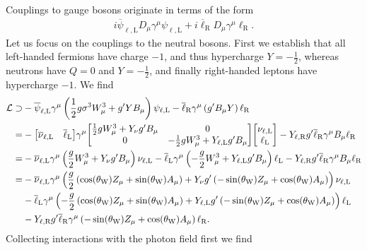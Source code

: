 Couplings to gauge bosons originate in terms of the form
\begin{align*}
	i\overline{\psi}_{\ell, \text{L}}D_{\mu}\gamma^{\mu}\psi_{\ell, \text{L}} + i\overline{\ell}_{\text{R}}D_{\mu}\gamma^{\mu}\ell_{\text{R}}.
\end{align*}
Let us focus on the couplings to the neutral bosons. First we establish that all left-handed fermions have charge $-1$, and thus hypercharge $Y = -\frac{1}{2}$, whereas neutrons have $Q = 0$ and $Y = -\frac{1}{2}$, and finally right-handed leptons have hypercharge $-1$. We find
\begin{align*}
	\lag \supset& -\overline{\psi}_{\ell, \text{L}}\gamma^{\mu}\left(\frac{1}{2}g\sigma^{3}W^{3}_{\mu} + g\p YB_{\mu}\right)\psi_{\ell, \text{L}} - \overline{\ell}_{\text{R}}\gamma^{\mu}\left(g\p B_{\mu}Y\right)\ell_{\text{R}} \\
    =& -\mqty[
		\overline{\nu}_{\ell, \text{L}} & \overline{\ell}_{\text{L}}
	]\gamma^{\mu}\mqty[
		\frac{1}{2}gW^{3}_{\mu} + Y_{\nu}g\p B_{\mu} & 0 \\
		 0 & -\frac{1}{2}gW^{3}_{\mu} + Y_{\ell, \text{L}}g\p B_{\mu}
	]\mqty[
		\nu_{\ell, \text{L}} \\
		\ell_{\text{L}}
	] - Y_{\ell, \text{R}}g\p\overline{\ell}_{\text{R}}\gamma^{\mu}B_{\mu}\ell_{\text{R}} \\
	=& -\overline{\nu}_{\ell, \text{L}}\gamma^{\mu}\left(\frac{g}{2}W^{3}_{\mu} + Y_{\nu}g\p B_{\mu}\right)\nu_{\ell, \text{L}} - \overline{\ell}_{\text{L}}\gamma^{\mu}\left(-\frac{g}{2}W^{3}_{\mu} + Y_{\ell, \text{L}}g\p B_{\mu}\right)\ell_{\text{L}} - Y_{\ell, \text{R}}g\p\overline{\ell}_{\text{R}}\gamma^{\mu}B_{\mu}\ell_{\text{R}} \\
	=& -\overline{\nu}_{\ell, \text{L}}\gamma^{\mu}\left(\frac{g}{2}\left(\cos(\theta_{\text{W}})Z_{\mu} + \sin(\theta_{\text{W}})A_{\mu}\right) + Y_{\nu}g\p \left(-\sin(\theta_{\text{W}})Z_{\mu} + \cos(\theta_{\text{W}})A_{\mu}\right)\right)\nu_{\ell, \text{L}} \\
	 &- \overline{\ell}_{\text{L}}\gamma^{\mu}\left(-\frac{g}{2}\left(\cos(\theta_{\text{W}})Z_{\mu} + \sin(\theta_{\text{W}})A_{\mu}\right) + Y_{\ell, \text{L}}g\p \left(-\sin(\theta_{\text{W}})Z_{\mu} + \cos(\theta_{\text{W}})A_{\mu}\right)\right)\ell_{\text{L}} \\
	 &- Y_{\ell, \text{R}}g\p\overline{\ell}_{\text{R}}\gamma^{\mu}\left(-\sin(\theta_{\text{W}})Z_{\mu} + \cos(\theta_{\text{W}})A_{\mu}\right)\ell_{\text{R}}.
\end{align*}
Collecting interactions with the photon field first we find
